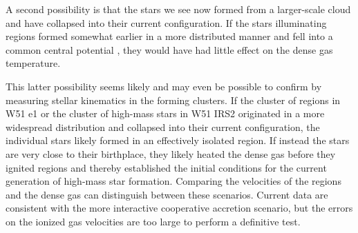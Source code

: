 \documentclass{emulateapj}
\begin{document}
A second possibility is that the stars we see now formed from a larger-scale
cloud and have collapsed into their current configuration.  If the stars
illuminating \hchii regions formed somewhat earlier in a more distributed
manner and fell into a common central potential \citep[e.g., the `conveyor
belt' scenario for cluster
formation,][]{Ginsburg2012a,Longmore2014a,Walker2016a}, they would have had
little effect on the dense gas temperature.

This latter possibility seems likely and may even be possible to confirm by
measuring stellar kinematics in the forming clusters.  If the cluster of \hchii
regions in W51 e1 or the cluster of high-mass stars in W51 IRS2 originated in a
more widespread distribution and collapsed into their current configuration,
the individual stars likely formed in an effectively isolated region.  If
instead the stars are very close to their birthplace, they likely heated the
dense gas before they ignited \hii regions and thereby established the initial
conditions for the current generation of high-mass star formation.  Comparing
the velocities of the \hii regions and the dense gas can distinguish
between these scenarios.  Current data \citep{Ginsburg2016a} are consistent
with the more interactive cooperative accretion scenario, but the errors on the
ionized gas velocities are too large to perform a definitive test.


\end{document}
